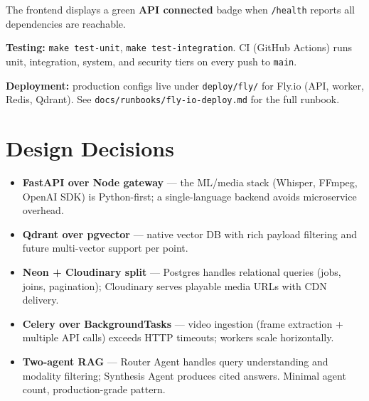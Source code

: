 \documentclass[10pt,a4paper]{article}
\begin{document}
The frontend displays a green \textbf{API connected} badge when \texttt{/health} reports all dependencies are reachable.

\textbf{Testing:} \texttt{make test-unit}, \texttt{make test-integration}. CI (GitHub Actions) runs unit, integration, system, and security tiers on every push to \texttt{main}.

\textbf{Deployment:} production configs live under \texttt{deploy/fly/} for Fly.io (API, worker, Redis, Qdrant). See \texttt{docs/runbooks/fly-io-deploy.md} for the full runbook.

\section{Design Decisions}

\begin{itemize}
  \item \textbf{FastAPI over Node gateway} --- the ML/media stack (Whisper, FFmpeg, OpenAI SDK) is Python-first; a single-language backend avoids microservice overhead.
  \item \textbf{Qdrant over pgvector} --- native vector DB with rich payload filtering and future multi-vector support per point.
  \item \textbf{Neon + Cloudinary split} --- Postgres handles relational queries (jobs, joins, pagination); Cloudinary serves playable media URLs with CDN delivery.
  \item \textbf{Celery over BackgroundTasks} --- video ingestion (frame extraction + multiple API calls) exceeds HTTP timeouts; workers scale horizontally.
  \item \textbf{Two-agent RAG} --- Router Agent handles query understanding and modality filtering; Synthesis Agent produces cited answers. Minimal agent count, production-grade pattern.
\end{itemize}
\end{document}
